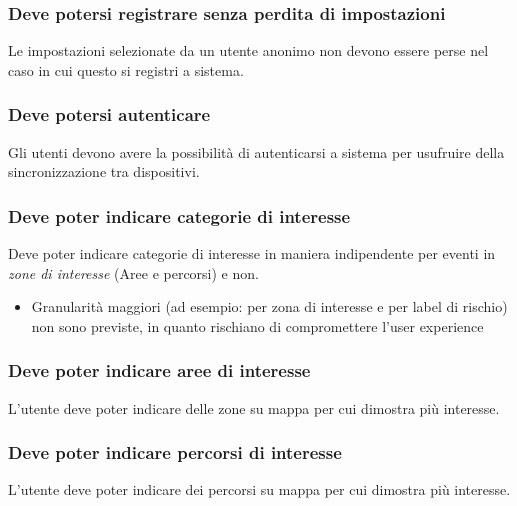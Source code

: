\documentclass{article}
\begin{document}
\subsubsection{Deve potersi registrare senza perdita di impostazioni}
\label{5.1.5}
Le impostazioni selezionate da un utente anonimo non devono essere perse nel caso in cui questo si registri a sistema.

\subsubsection{Deve potersi autenticare}
\label{5.1.6}
Gli utenti devono avere la possibilità di autenticarsi a sistema per usufruire della sincronizzazione tra dispositivi.

\subsubsection{Deve poter indicare categorie di interesse}
\label{5.1.7}
Deve poter indicare categorie di interesse in maniera indipendente per eventi in \textit{zone di interesse} (Aree e percorsi) e non.
\begin{itemize}
    \item Granularità maggiori (ad esempio: per zona di interesse e per label di rischio) non sono previste, in quanto rischiano di compromettere l'user experience
\end{itemize}

\subsubsection{Deve poter indicare aree di interesse}
\label{5.1.8}
L'utente deve poter indicare delle zone su mappa per cui dimostra più interesse.

\subsubsection{Deve poter indicare percorsi di interesse}
\label{5.1.9}
L'utente deve poter indicare dei percorsi su mappa per cui dimostra più interesse.
\end{document}
